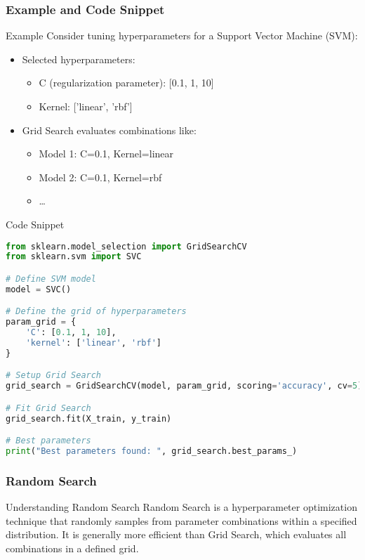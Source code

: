 \documentclass[aspectratio=169]{beamer}
\begin{document}
\begin{frame}[fragile]
    \frametitle{Example and Code Snippet}
    \begin{block}{Example}
        Consider tuning hyperparameters for a Support Vector Machine (SVM):
        \begin{itemize}
            \item Selected hyperparameters: 
            \begin{itemize}
                \item C (regularization parameter): [0.1, 1, 10]
                \item Kernel: ['linear', 'rbf']
            \end{itemize}
            \item Grid Search evaluates combinations like:
            \begin{itemize}
                \item Model 1: C=0.1, Kernel=linear
                \item Model 2: C=0.1, Kernel=rbf
                \item \ldots
            \end{itemize}
        \end{itemize}
    \end{block}
    
    \begin{block}{Code Snippet}
        \begin{lstlisting}[language=Python]
from sklearn.model_selection import GridSearchCV
from sklearn.svm import SVC

# Define SVM model
model = SVC()

# Define the grid of hyperparameters
param_grid = {
    'C': [0.1, 1, 10],
    'kernel': ['linear', 'rbf']
}

# Setup Grid Search
grid_search = GridSearchCV(model, param_grid, scoring='accuracy', cv=5)

# Fit Grid Search
grid_search.fit(X_train, y_train)

# Best parameters
print("Best parameters found: ", grid_search.best_params_)
        \end{lstlisting}
    \end{block}
\end{frame}

\begin{frame}[fragile]
    \frametitle{Random Search}
    \begin{block}{Understanding Random Search}
        Random Search is a hyperparameter optimization technique that randomly samples from parameter combinations within a specified distribution. It is generally more efficient than Grid Search, which evaluates all combinations in a defined grid.
    \end{block}
\end{frame}
\end{document}
